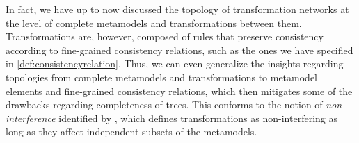 In fact, we have up to now discussed the topology of transformation networks at the level of complete metamodels and transformations between them.
Transformations are, however, composed of rules that preserve consistency according to fine-grained consistency relations, such as the ones we have specified in \autoref{def:consistencyrelation}.
Thus, we can even generalize the insights regarding topologies from complete metamodels and transformations to metamodel elements and fine-grained consistency relations, which then mitigates some of the drawbacks regarding completeness of trees.
This conforms to the notion of \emph{non-interference} identified by \textcite{stevens2020BidirectionalTransformationLarge-SoSym}, which defines transformations as non-interfering as long as they affect independent subsets of the metamodels.







